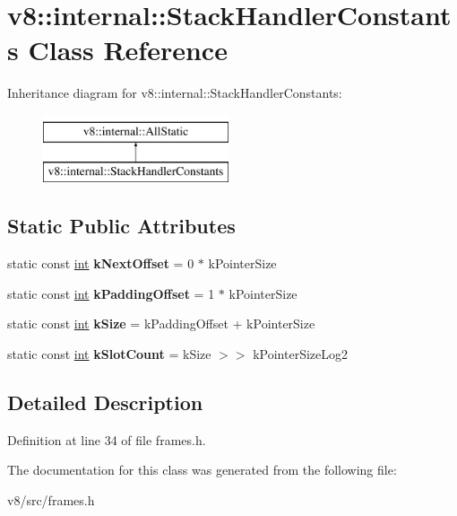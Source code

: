 \hypertarget{classv8_1_1internal_1_1StackHandlerConstants}{}\section{v8\+:\+:internal\+:\+:Stack\+Handler\+Constants Class Reference}
\label{classv8_1_1internal_1_1StackHandlerConstants}
Inheritance diagram for v8\+:\+:internal\+:\+:Stack\+Handler\+Constants\+:\begin{figure}[H]
\begin{center}
\leavevmode
\includegraphics[height=2.000000cm]{classv8_1_1internal_1_1StackHandlerConstants}
\end{center}
\end{figure}
\subsection*{Static Public Attributes}
\begin{DoxyCompactItemize}
\item 
\mbox{\label{classv8_1_1internal_1_1StackHandlerConstants_a705ae64dfed67338f0275c70e02cc458}} 
static const \mbox{\hyperlink{classint}{int}} {\bfseries k\+Next\+Offset} = 0 $\ast$ k\+Pointer\+Size
\item 
\mbox{\label{classv8_1_1internal_1_1StackHandlerConstants_a0b7f2f16d96c8d879adba2af042994cf}} 
static const \mbox{\hyperlink{classint}{int}} {\bfseries k\+Padding\+Offset} = 1 $\ast$ k\+Pointer\+Size
\item 
\mbox{\label{classv8_1_1internal_1_1StackHandlerConstants_abf599d4b8b409672c9e68875be6fd35e}} 
static const \mbox{\hyperlink{classint}{int}} {\bfseries k\+Size} = k\+Padding\+Offset + k\+Pointer\+Size
\item 
\mbox{\label{classv8_1_1internal_1_1StackHandlerConstants_aac64362c6b9a4e36fa0b39217b2185b9}} 
static const \mbox{\hyperlink{classint}{int}} {\bfseries k\+Slot\+Count} = k\+Size $>$$>$ k\+Pointer\+Size\+Log2
\end{DoxyCompactItemize}


\subsection{Detailed Description}


Definition at line 34 of file frames.\+h.



The documentation for this class was generated from the following file\+:\begin{DoxyCompactItemize}
\item 
v8/src/frames.\+h\end{DoxyCompactItemize}
